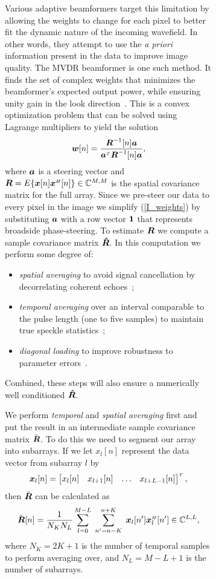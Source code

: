 \begin{figure}[htbp]
\begin{figure}[htbp]
Various adaptive beamformers target this limitation by allowing the weights to change for each pixel to better fit the dynamic nature of the incoming wavefield. In other words, they attempt to use the \emph{a priori} information present in the data to improve image quality. The MVDR beamformer is one such method. It finds the set of complex weights that minimizes the beamformer's expected output power, while ensuring unity gain in the look direction~\cite{Capon1969}. This is a convex optimization problem that can be solved using Lagrange multipliers to yield the solution
\begin{gather}
\vec w[n] = \frac{\Ri[n]\a}{\a\T\Ri[n]\a},\label{I_weights}
\end{gather}
where $\boldsymbol{a}$ is a steering vector and $\boldsymbol{R}=E\{\boldsymbol{x}[n]\boldsymbol{x}^{\scriptscriptstyle H}[n]\}\in\mathbb{C}^{M,M}$ is the spatial covariance matrix for the full array. Since we pre-steer our data to every pixel in the image we simplify (\ref{I_weights}) by substituting $\boldsymbol{a}$ with a row vector $\boldsymbol{1}$ that represents broadside phase-steering. To estimate $\boldsymbol{R}$ we compute a sample covariance matrix $\boldsymbol{\hat R}$. In this computation we perform some degree of:
\begin{itemize}
\item \emph{spatial averaging} to avoid signal cancellation by decorrelating coherent echoes~\cite{Kailath1985};
\item \emph{temporal averaging} over an interval comparable to the pulse length (one to five samples) to maintain true speckle statistics~\cite{Synnevag2009};
\item \emph{diagonal loading} to improve robustness to parameter errors~\cite{Cox1987,Maksym1979}.
\end{itemize}%
%
%
Combined, these steps will also ensure a numerically well conditioned $\boldsymbol{\hat R}$.

We perform \emph{temporal} and \emph{spatial averaging} first and put the result in an intermediate sample covariance matrix $\breve{\boldsymbol{R}}$. To do this we need to segment our array into subarrays. If we let $x_l[n]$ represent the data vector from subarray $l$ by
\begin{gather}
\boldsymbol{x}_l[n] = \begin{bmatrix}x_l[n] & x_{l+1}[n] & \dots & x_{l+L-1}[n]\end{bmatrix}^{\scriptscriptstyle T},
\end{gather}
then $\breve{\boldsymbol{R}}$ can be calculated as
\begin{gather}
\breve{\R}[n] =  \frac{1}{N_K N_L} \sumb{l=0}{M-L}\sumb{n'=n-K}{n+K} \x_l[n']\x_l\H[n'] \in\mathbb{C}^{L,L},\label{I_spatialR}
\end{gather}
where $N_K = 2K+1$ is the number of temporal samples to perform averaging over, and $N_L = M-L+1$ is the number of subarrays.


\end{figure}
\end{figure}
